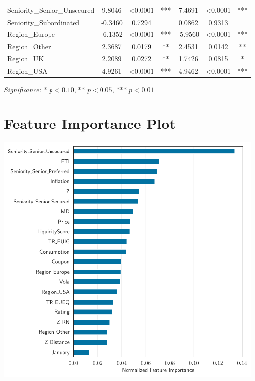 \begin{center}
\begin{minipage}{\textwidth}
\begin{tabular}{lcccccc}
    Seniority\_Senior\_Unsecured & 9.8046 & <0.0001 & *** & 7.4691 & <0.0001 & *** \\
    Seniority\_Subordinated & -0.3460 & 0.7294 &  & 0.0862 & 0.9313 &  \\
    Region\_Europe & -6.1352 & <0.0001 & *** & -5.9560 & <0.0001 & *** \\
    Region\_Other & 2.3687 & 0.0179 & ** & 2.4531 & 0.0142 & ** \\
    Region\_UK & 2.2089 & 0.0272 & ** & 1.7426 & 0.0815 & * \\
    Region\_USA & 4.9261 & <0.0001 & *** & 4.9462 & <0.0001 & *** \\
    \bottomrule
    \end{tabular}
    \caption*{\textit{Significance:} * $p<0.10$, ** $p<0.05$, *** $p<0.01$}
    \label{tab:feature_t_statistics}
\end{minipage}
\end{center}

\section{Feature Importance Plot}

\begin{center}
\begin{minipage}{\textwidth}
    \centering
    \includegraphics[width=\textwidth]{images/feature_importance.pdf}
    \label{fig:feature_importance}
\end{minipage}
\end{center}